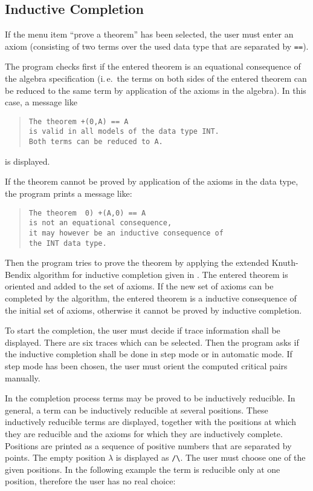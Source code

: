 \subsection{Inductive Completion}
\label{InductiveCompletion}
If the menu item ``prove a theorem'' has been selected,
the user must enter an axiom (consisting of two terms over the used data
type that are separated by {\tt ==}).

The program checks first if the entered theorem is an equational 
consequence of the algebra specification (i.\,e.\  the terms on both sides of
the entered theorem can be reduced to the same term by application of the 
axioms in the algebra). In this case, a message like
\begin{quote}
\begin{verbatim}
The theorem +(0,A) == A
is valid in all models of the data type INT.
Both terms can be reduced to A.
\end{verbatim}
\end{quote}
is displayed.

If the theorem cannot be proved by application of the axioms in the data type,
the program prints a message like:
\begin{quote}
\begin{verbatim}
The theorem  0) +(A,0) == A
is not an equational consequence, 
it may however be an inductive consequence of
the INT data type.
\end{verbatim}
\end{quote}
Then the program tries to prove the theorem by applying the extended 
Knuth-Bendix algorithm for inductive completion given in \cite{Kuechlin:89}.
The entered 
theorem is oriented and added to the set of axioms. If the new set of
axioms  can 
be completed by the algorithm, the entered theorem is a inductive consequence
of the initial set of axioms, otherwise it cannot be proved by inductive
completion.

To start the completion, the user must decide if trace information shall
be displayed.
There are six traces which can be selected.
Then the program asks if the inductive completion shall be done in step 
mode or in automatic mode. If step mode has been chosen, the user must 
orient the computed critical pairs manually.

In the completion process terms may be proved to be inductively 
reducible. In general, a term can be inductively reducible at several
positions. 
These inductively reducible terms are displayed, together with the
positions at which they are reducible and the axioms for which they
are inductively complete.
Positions are printed as a sequence of positive numbers
that are separated by points. The empty position $\lambda$ is displayed 
as \verb+/\+. The user must choose one of the given positions.
In the following example the term is reducible only
at one position, therefore the user has no real choice:

